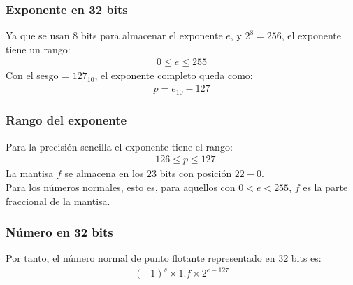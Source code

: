 \documentclass[12pt]{beamer}
\begin{document}
\begin{frame}
\frametitle{Exponente en 32 bits}
Ya que se usan $8$ bits para almacenar el exponente $e$, y $2^{8} = 256$, el exponente tiene un rango:
\pause
\begin{align*}
0 \leq e \leq 255
\end{align*}
\pause
Con el sesgo = $127_{10}$, el exponente completo queda como:
\begin{align*}
p = e_{10} - 127
\end{align*}
\end{frame}
\begin{frame}
\frametitle{Rango del exponente}
Para la precisión sencilla el exponente tiene el rango:
\pause
\begin{align*}
-126 \leq p \leq 127
\end{align*}
\pause
La mantisa $f$ se almacena en los $23$ bits con posición $22-0$. 
\\
\bigskip
\pause
Para los números normales, esto es, para aquellos con $0 < e < 255$, $f$ es la parte fraccional de la mantisa.
\end{frame}
\begin{frame}
\frametitle{Número en 32 bits}
Por tanto, el número normal de punto flotante representado en 32 bits es:
\pause
\begin{align*}
(-1)^{s} \times 1.f \times 2^{e-127} 
\end{align*}
\end{frame}
\end{document}
